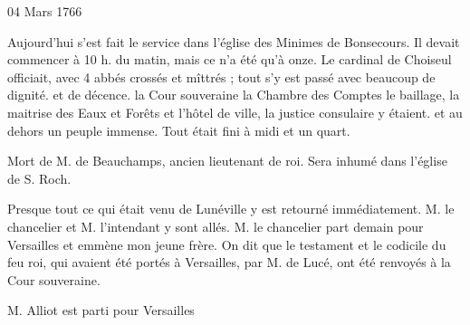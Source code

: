                      \begin{diary}{04 Mars 1766}{}

                         Aujourd'hui s'est fait le service dans
                           l’église des Minimes de
                              Bonsecours. Il
                           devait commencer à 10 h. du matin, mais
                           ce n'a été qu'à onze. Le cardinal de Choiseul
                           officiait, avec 4 abbés crossés et mîttrés ;
                           tout s'y est passé avec beaucoup de dignité.
                           et de décence. la Cour souveraine
                           la Chambre des Comptes
                           le
                              baillage, la maitrise
                              des Eaux et Forêts et l'hôtel
                              de ville, la justice consulaire y étaient.
                           et au dehors un peuple immense. Tout
                           était fini à midi et un quart. \bigskip


                         Mort de M.
                              de Beauchamps, ancien lieutenant
                           de roi. Sera inhumé dans l’église de
                              S. Roch. \bigskip



                         Presque tout ce qui était venu de
                           Lunéville y est retourné immédiatement.
                           M. le chancelier et M. l'intendant y
                           sont allés. M. le chancelier
                           part demain
                           pour Versailles et emmène
                           mon jeune frère.
                           On dit que le testament et le codicile du
                           feu roi, qui avaient été
                           portés à
                           Versailles, par M. de Lucé, ont été renvoyés
                           à la Cour souveraine. \bigskip



                           M. Alliot est parti pour Versailles
                        \bigskip


                     \end{diary}
